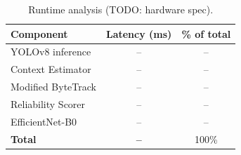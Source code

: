 \begin{table}[h]
  \centering
  \caption{Runtime analysis (TODO: hardware spec).}
  \label{tab:runtime}
  \begin{tabular}{lcc}
    \toprule
    Component & Latency (ms) & \% of total \\
    \midrule
    YOLOv8 inference    & -- & -- \\
    Context Estimator   & -- & -- \\
    Modified ByteTrack  & -- & -- \\
    Reliability Scorer  & -- & -- \\
    EfficientNet-B0     & -- & -- \\
    \midrule
    \textbf{Total}      & \textbf{--} & 100\% \\
    \bottomrule
  \end{tabular}
\end{table}

